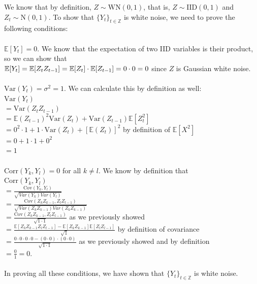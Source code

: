 \documentclass{article}
\begin{document}
{We know that by definition, $Z \sim \text{WN}(0, 1)$, that is, $Z \sim \text{IID}(0, 1)$ and $Z_t \sim \text{N}(0, 1)$. 
To show that $\{Y_t\}_{t \in \mathbb{Z}}$ is white noise, we need to prove the following conditions: \\ \\ 
$\mathbb{E}[Y_t] = 0$. We know that the expectation of two IID variables is their product, so we can show that \\
$\mathbb{E}[Y_t] \\ = \mathbb{E}[Z_tZ_{t-1}] \\ = \mathbb{E}[Z_t] \cdot \mathbb{E}[Z_{t-1}] \\ = 0 \cdot 0 = 0$ \hfill since $Z$ is Gaussian white noise. \\ \\ 
$\text{Var}(Y_t) = \sigma^2 = 1$. We can calculate this by definition as well: \\
$\text{Var}(Y_t)$ \\
$= \text{Var}(Z_tZ_{t-1})$ \\ 
$= \mathbb{E}(Z_{t-1})^2\text{Var}(Z_t) + \text{Var}(Z_{t-1})\mathbb{E}[Z_t^2]$ \\
$= 0^2 \cdot 1 + 1 \cdot \text{Var}(Z_t) + [\mathbb{E}(Z_t)]^2$ \hfill by definition of $\mathbb{E}[X^2]$ \\
$= 0 + 1 \cdot  1 + 0^2$ \\
$= 1$ \\ \\
$\text{Corr}(Y_k, Y_l) = 0$ for all $k \neq l$. We know by definition that \\
$\text{Corr}(Y_k, Y_l)$ \\ 
$= \frac{\text{Cov}(Y_k, Y_l)}{\sqrt{Var(Y_k)Var(Y_l)}}$ \\
$= \frac{\text{Cov}(Z_kZ_{k-1}, Z_lZ_{l-1})}{\sqrt{Var(Z_kZ_{k-1})Var(Z_kZ_{k-1})}} $ \\ 
$= \frac{\text{Cov}(Z_kZ_{k-1}, Z_lZ_{l-1})}{\sqrt{1 \cdot 1}} $ \hfill as we previously showed \\ 
$= \frac{\mathbb{E}[Z_kZ_{k-1}Z_lZ_{l-1}] - \mathbb{E}[Z_kZ_{k-1}]\mathbb{E}[Z_lZ_{l-1}]}{\sqrt{1}} $ \hfill by definition of covariance \\ 
$= \frac{0 \cdot 0 \cdot 0 \cdot 0 - (0 \cdot 0) \cdot (0 \cdot 0)}{\sqrt{1 \cdot 1}
} $ \hfill as we previously showed and by definition \\
$= \frac{0}{1} = 0.$ \\ \\ 
In proving all these conditions, we have shown that $\{Y_t\}_{t \in \mathbb{Z}}$ is white noise.

}
\end{document}
